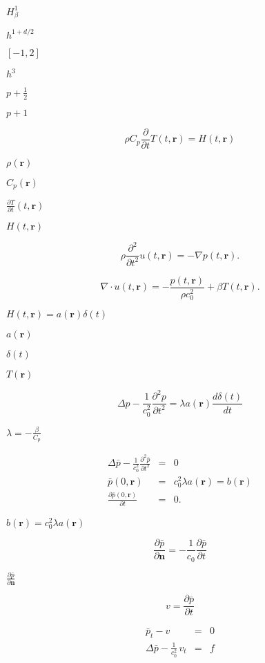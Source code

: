 \documentclass{article}
\begin{document}
$H^1_\beta$
\pagebreak

$h^{1+d/2}$
\pagebreak

$[-1,2]$
\pagebreak

$h^3$
\pagebreak

$p+\frac 12$
\pagebreak

$p+1$
\pagebreak

\[ \rho C_p \frac{\partial}{\partial t}T(t,\mathbf r) = H(t,\mathbf r) \]
\pagebreak

$\rho (\mathbf r) $
\pagebreak

$C_p (\mathbf r) $
\pagebreak

$\frac{\partial T}{\partial t}(t,\mathbf r)$
\pagebreak

$H(t,\mathbf r)$
\pagebreak

\[ \rho \frac{\partial^2}{\partial t^2}u(t,\mathbf r) = -\nabla p(t,\mathbf r). \]
\pagebreak

\[ \nabla \cdot u(t,\mathbf r) = -\frac{p(t,\mathbf r)}{\rho c_0^2}+\beta T(t,\mathbf r) . \]
\pagebreak

$H(t,\mathbf r) = a(\mathbf r)\delta(t)$
\pagebreak

$a(\mathbf r)$
\pagebreak

$\delta(t)$
\pagebreak

$T(\mathbf r)$
\pagebreak

\[ \Delta p-\frac{1}{c_0^2} \frac{\partial^2 p}{\partial t^2} = \lambda a(\mathbf r)\frac{d\delta(t)}{dt} \]
\pagebreak

$\lambda = - \frac{\beta}{C_p}$
\pagebreak

\begin{eqnarray*} \Delta \bar{p}- \frac{1}{c_0^2} \frac{\partial^2 \bar{p}}{\partial t^2} & = & 0 \\ \bar{p}(0,\mathbf r) &=& c_0^2 \lambda a(\mathbf r) = b(\mathbf r) \\ \frac{\partial\bar{p}(0,\mathbf r)}{\partial t} &=& 0. \end{eqnarray*}
\pagebreak

$b(\mathbf r) = c_0^2 \lambda a(\mathbf r)$
\pagebreak

\[ \frac{\partial\bar{p}}{\partial\mathbf n} = -\frac{1}{c_0} \frac{\partial\bar{p}}{\partial t} \]
\pagebreak

$\frac{\partial\bar{p}}{\partial\mathbf n}$
\pagebreak

\[ v = \frac{\partial\bar{p}}{\partial t} \]
\pagebreak

\begin{eqnarray*} \bar{p}_{t} - v & = & 0 \\ \Delta\bar{p} - \frac{1}{c_0^2}\,v_{t} & = & f \end{eqnarray*}
\pagebreak
\end{document}
